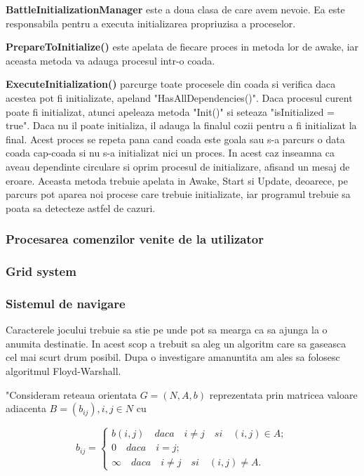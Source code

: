 \documentclass[12pt, a4paper]{article}
\begin{document}
	\textbf{BattleInitializationManager} este a doua clasa de care avem nevoie. Ea este responsabila pentru a executa initializarea propriuzisa a proceselor. 
	
	\textbf{PrepareToInitialize()} este apelata de fiecare proces in metoda lor de awake, iar aceasta metoda va adauga procesul intr-o coada.
	
	\textbf{ExecuteInitialization()} parcurge toate procesele din coada si verifica daca acestea pot fi initializate, apeland "HasAllDependencies()". Daca procesul curent poate fi initializat, atunci apeleaza metoda "Init()" si seteaza "isInitialized = true". Daca nu il poate initializa, il adauga la finalul cozii pentru a fi initializat la final. Acest proces se repeta pana cand coada este goala sau s-a parcurs o data coada cap-coada si nu s-a initializat nici un proces. In acest caz inseamna ca aveau dependinte circulare si oprim procesul de initializare, afisand un mesaj de eroare. Aceasta metoda trebuie apelata in Awake, Start si Update, deoarece, pe parcurs pot aparea noi procese care trebuie initializate, iar programul trebuie sa poata sa detecteze astfel de cazuri.
	
	\subsubsection{Procesarea comenzilor venite de la utilizator}
	
	\subsubsection{Grid system}
	
	\subsubsection{Sistemul de navigare}
	
	Caracterele jocului trebuie sa stie pe unde pot sa mearga ca sa ajunga la o anumita destinatie. In acest scop a trebuit sa aleg un algoritm care sa gaseasca cel mai scurt drum posibil. Dupa o investigare amanuntita am ales sa folosesc algoritmul Floyd-Warshall.
	
	"Consideram reteaua orientata $G = (N, A, b)$ reprezentata prin matricea valoare adiacenta $B = (b_{ij}), i, j \in N$ cu
	
	\begin{equation*}
		b_{ij} = \begin{cases}
			b(i, j) \quad daca \quad i \neq j \quad si \quad (i, j) \in A; \\
			0 \quad daca \quad i = j; \\
			\infty \quad daca \quad i \neq j \quad si \quad (i, j) \neq A.
		\end{cases}
	\end{equation*}
\end{document}

